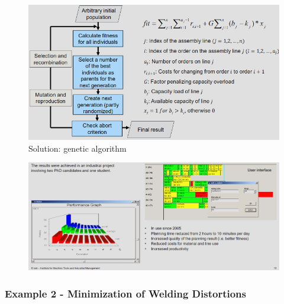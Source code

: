 \documentclass[12pt, a4paper, oneside, justified]{article}
\begin{document}
\begin{figure}[htbp]
    \centering
    \includegraphics[scale=1]{../img/1-3.png}
    \caption{Solution: genetic algorithm}
    \label{img/1-3}
\end{figure}
\begin{figure}[htbp]
    \centering
    \includegraphics[scale=0.9]{../img/1-4.png}
    \label{img/1-4}
\end{figure}

\subsubsection{Example 2 - Minimization of Welding Distortions }
\vspace{1cm}
\end{document}
